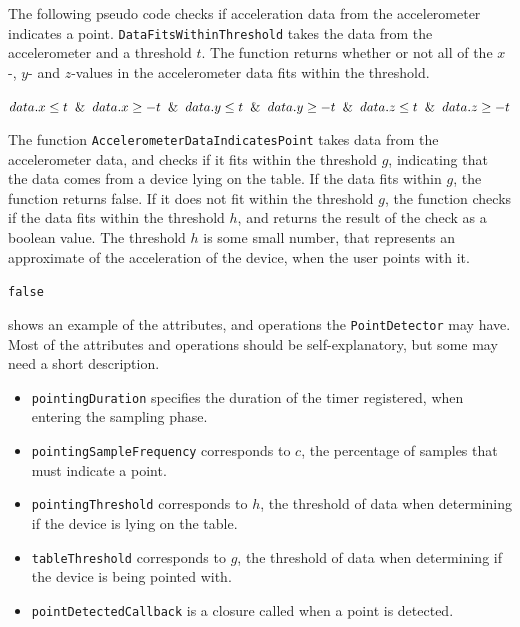 The following pseudo code checks if acceleration data from the accelerometer indicates a point. 
\texttt{DataFitsWithinThreshold} takes the data from the accelerometer and a threshold $t$. 
The function returns whether or not all of the $x$-, $y$- and $z$-values in the accelerometer data fits within the threshold.

\begin{algorithm}[!hbt]
  \begin{algorithmic}
      \State \Return $data.x \leq t \And data.x \geq -t \And data.y \leq t \And data.y \geq -t \And data.z \leq t \And data.z \geq -t$
    \EndFunction
  \end{algorithmic}
\end{algorithm}

The function \texttt{AccelerometerDataIndicatesPoint} takes data from the accelerometer data, 
and checks if it fits within the threshold $g$, 
indicating that the data comes from a device lying on the table. 
If the data fits within $g$, 
the function returns false. 
If it does not fit within the threshold $g$, 
the function checks if the data fits within the threshold $h$, 
and returns the result of the check as a boolean value. 
The threshold $h$ is some small number, 
that represents an approximate of the acceleration of the device, 
when the user points with it.

\begin{algorithm}[!hbt]
  \begin{algorithmic}
    \State \Return \texttt{false}
    \Else
    \State \Return {}
    \EndIf
    \EndFunction
  \end{algorithmic}
\end{algorithm}

 shows an example of the attributes, 
and operations the \texttt{PointDetector} may have. 
Most of the attributes and operations should be self-explanatory, 
but some may need a short description.

\begin{itemize}
  \item \texttt{pointingDuration} specifies the duration of the timer registered, when entering the sampling phase.
  \item \texttt{pointingSampleFrequency} corresponds to $c$, the percentage of samples that must indicate a point.
  \item \texttt{pointingThreshold} corresponds to $h$, the threshold of data when determining if the device is lying on the table.
  \item \texttt{tableThreshold} corresponds to $g$, the threshold of data when determining if the device is being pointed with.
  \item \texttt{pointDetectedCallback} is a closure called when a point is detected.
\end{itemize}

